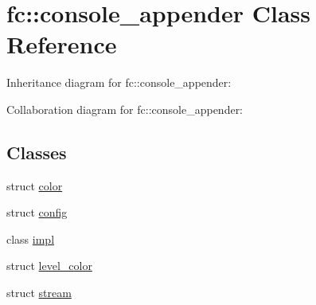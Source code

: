 \hypertarget{classfc_1_1console__appender}{}\section{fc\+:\+:console\+\_\+appender Class Reference}
\label{classfc_1_1console__appender}


Inheritance diagram for fc\+:\+:console\+\_\+appender\+:


Collaboration diagram for fc\+:\+:console\+\_\+appender\+:
\subsection*{Classes}
\begin{DoxyCompactItemize}
\item 
struct \mbox{\hyperlink{structfc_1_1console__appender_1_1color}{color}}
\item 
struct \mbox{\hyperlink{structfc_1_1console__appender_1_1config}{config}}
\item 
class \mbox{\hyperlink{classfc_1_1console__appender_1_1impl}{impl}}
\item 
struct \mbox{\hyperlink{structfc_1_1console__appender_1_1level__color}{level\+\_\+color}}
\item 
struct \mbox{\hyperlink{structfc_1_1console__appender_1_1stream}{stream}}
\end{DoxyCompactItemize}

